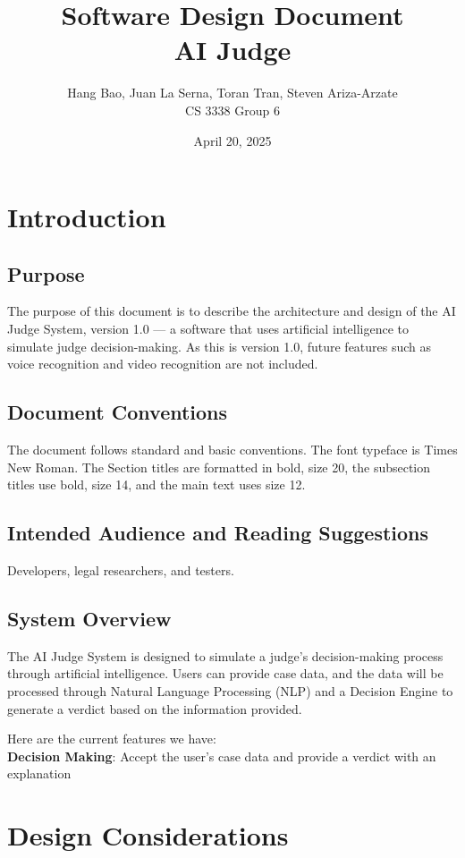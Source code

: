 \documentclass[12pt]{article}
\title{\textbf{Software Design Document}\\[1ex] \Large AI Judge}
\author{Hang Bao, Juan La Serna, Toran Tran, Steven Ariza-Arzate\\CS 3338 Group 6}
\date{April 20, 2025}
\begin{document}
\maketitle
\tableofcontents
\newpage

\section{Introduction}
\subsection{Purpose}
The purpose of this document is to describe the architecture and design of the AI Judge System, version 1.0 — a software that uses artificial intelligence to simulate judge decision-making. As this is version 1.0, future features such as voice recognition and video recognition are not included.

\subsection{Document Conventions}
The document follows standard and basic conventions. The font typeface is Times New Roman. The Section titles are formatted in bold, size 20, the subsection titles use bold, size 14, and the main text uses size 12.

\subsection{Intended Audience and Reading Suggestions}
Developers, legal researchers, and testers.

\subsection{System Overview}
The AI Judge System is designed to simulate a judge's decision-making process through artificial intelligence.  Users can provide case data, and the data will be processed through Natural Language Processing (NLP) and a Decision Engine to generate a verdict based on the information provided.

Here are the current features we have:\\
\textbf{Decision Making}: Accept the user’s case data and provide a verdict with an explanation

\section{Design Considerations}
\end{document}
